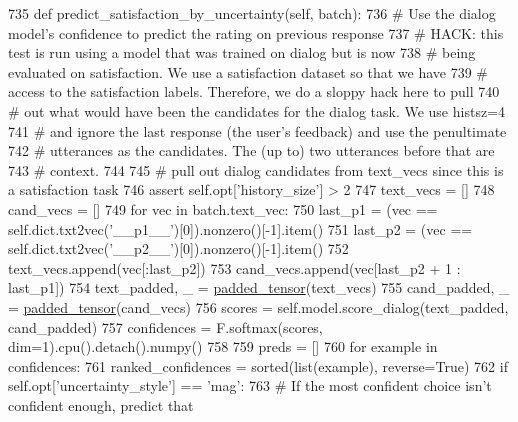 \begin{DoxyCode}
735     \textcolor{keyword}{def }predict\_satisfaction\_by\_uncertainty(self, batch):
736         \textcolor{comment}{# Use the dialog model's confidence to predict the rating on previous response}
737         \textcolor{comment}{# HACK: this test is run using a model that was trained on dialog but is now}
738         \textcolor{comment}{# being evaluated on satisfaction. We use a satisfaction dataset so that we have}
739         \textcolor{comment}{# access to the satisfaction labels. Therefore, we do a sloppy hack here to pull}
740         \textcolor{comment}{# out what would have been the candidates for the dialog task. We use histsz=4}
741         \textcolor{comment}{# and ignore the last response (the user's feedback) and use the penultimate}
742         \textcolor{comment}{# utterances as the candidates. The (up to) two utterances before that are}
743         \textcolor{comment}{# context.}
744 
745         \textcolor{comment}{# pull out dialog candidates from text\_vecs since this is a satisfaction task}
746         \textcolor{keyword}{assert} self.opt[\textcolor{stringliteral}{'history\_size'}] > 2
747         text\_vecs = []
748         cand\_vecs = []
749         \textcolor{keywordflow}{for} vec \textcolor{keywordflow}{in} batch.text\_vec:
750             last\_p1 = (vec == self.dict.txt2vec(\textcolor{stringliteral}{'\_\_p1\_\_'})[0]).nonzero()[-1].item()
751             last\_p2 = (vec == self.dict.txt2vec(\textcolor{stringliteral}{'\_\_p2\_\_'})[0]).nonzero()[-1].item()
752             text\_vecs.append(vec[:last\_p2])
753             cand\_vecs.append(vec[last\_p2 + 1 : last\_p1])
754         text\_padded, \_ = \hyperlink{namespaceparlai_1_1agents_1_1legacy__agents_1_1seq2seq_1_1utils__v1_adb5a414ae439f14c54e8c760b91cc4c8}{padded\_tensor}(text\_vecs)
755         cand\_padded, \_ = \hyperlink{namespaceparlai_1_1agents_1_1legacy__agents_1_1seq2seq_1_1utils__v1_adb5a414ae439f14c54e8c760b91cc4c8}{padded\_tensor}(cand\_vecs)
756         scores = self.model.score\_dialog(text\_padded, cand\_padded)
757         confidences = F.softmax(scores, dim=1).cpu().detach().numpy()
758 
759         preds = []
760         \textcolor{keywordflow}{for} example \textcolor{keywordflow}{in} confidences:
761             ranked\_confidences = sorted(list(example), reverse=\textcolor{keyword}{True})
762             \textcolor{keywordflow}{if} self.opt[\textcolor{stringliteral}{'uncertainty\_style'}] == \textcolor{stringliteral}{'mag'}:
763                 \textcolor{comment}{# If the most confident choice isn't confident enough, predict that}

\end{DoxyCode}
